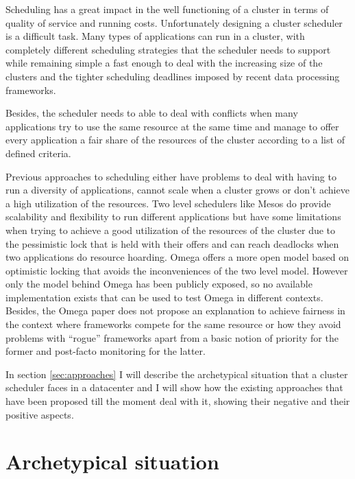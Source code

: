 \documentclass{svjour3}                     %
\begin{document}

Scheduling has a great impact in the well functioning of a cluster in
terms of quality of service and running costs.  Unfortunately
designing a cluster scheduler is a difficult task. Many types
of applications can run in a cluster, with completely different
scheduling strategies that the scheduler needs to support while
remaining simple a fast enough to deal with the increasing size of
the clusters and the tighter scheduling deadlines imposed by recent
data processing frameworks.

Besides, the scheduler needs to able to deal with conflicts when many
applications try to use the same resource at the same time and manage
to offer every application a fair share of the resources of the cluster
according to a list of defined criteria.

Previous approaches to scheduling either have problems to deal with 
having to run a diversity of applications, cannot scale when a cluster
grows or don't achieve a high utilization of the resources. Two level 
schedulers like Mesos \cite{Hindman10mesos:a} do provide scalability 
and flexibility to run different applications but have some limitations when
trying to achieve a good utilization of the resources of the cluster
due to the pessimistic lock that is held with their offers and can reach
deadlocks when two applications do resource hoarding. Omega \cite{41684}
offers a more open model based on optimistic locking that avoids the 
inconveniences of the two level model. However only the model behind Omega
has been publicly exposed, so no available implementation exists that can
be used to test Omega in different contexts. Besides, the Omega paper
does not propose an explanation to achieve fairness in the context where
frameworks compete for the same resource or how they avoid problems with
``rogue'' frameworks apart from a basic notion of priority for the former 
and post-facto monitoring for the latter.



In section \ref{sec:approaches} I will describe the archetypical situation
that a cluster scheduler faces in a datacenter and I will show how the
existing approaches that have been proposed till the moment deal with it,
showing their negative and their positive aspects.

\section{Archetypical situation}
\end{document}
